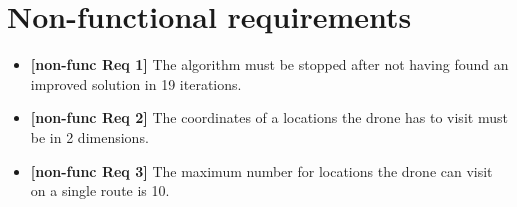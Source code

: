 \section{Non-functional requirements}
\begin{itemize}
	\item \textbf{[non-func Req 1]} The algorithm must be stopped after not having found an improved solution in 19 iterations.
	\item \textbf{[non-func Req 2]} The coordinates of a locations the drone has to visit must be in 2 dimensions.  
	\item \textbf{[non-func Req 3]} The maximum number for locations the drone can visit on a single route is 10.
\end{itemize}